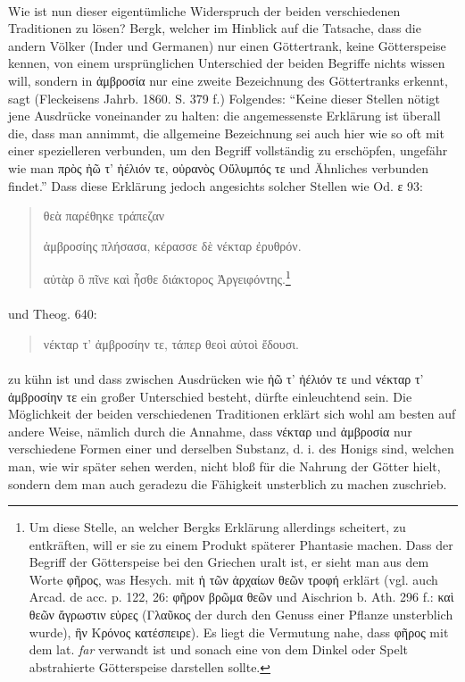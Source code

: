 \documentclass[a4paper, 11pt, oneside]{article}
\begin{document}
\paragraph{}
Wie ist nun dieser eigentümliche Widerspruch der beiden verschiedenen Traditionen zu lösen? Bergk, welcher im Hinblick auf die Tatsache, dass die andern Völker (Inder und Germanen) nur einen Göttertrank, keine Götterspeise kennen, von einem ursprünglichen Unterschied der beiden Begriffe nichts wissen will, sondern in ἀμβροσία nur eine zweite Bezeichnung des Göttertranks erkennt, sagt (Fleckeisens Jahrb. 1860. S. 379 f.) Folgendes: "`Keine dieser Stellen nötigt jene Ausdrücke voneinander zu halten: die angemessenste Erklärung ist überall die, dass man annimmt, die allgemeine Bezeichnung sei auch hier wie so oft mit einer spezielleren verbunden, um den Begriff vollständig zu erschöpfen, ungefähr wie man πρὸς ἠῶ τ' ἠέλιόν τε, οὐρανὸς Οὔλυμπός τε und Ähnliches verbunden findet."' Dass diese Erklärung jedoch angesichts solcher Stellen wie Od. ε 93:
\begin{quotation}
\hspace*{15mm}θεὰ παρέθηκε τράπεζαν

ἀμβροσίης πλήσασα, κέρασσε δὲ νέκταρ ἐρυθρόν.

αὐτὰρ ὃ πῖνε καὶ ἦσθε διάκτορος Ἀργειφόντης.\footnote{Um diese Stelle, an welcher Bergks Erklärung allerdings scheitert, zu entkräften, will er sie zu einem Produkt späterer Phantasie machen. Dass der Begriff der Götterspeise bei den Griechen uralt ist, er sieht man aus dem Worte φῆρος, was Hesych. mit ἡ τῶν ἀρχαίων θεῶν τροφή erklärt (vgl. auch Arcad. de acc. p. 122, 26: φῆρον βρῶμα θεῶν und Aischrion b. Ath. 296 f.: καὶ θεῶν ἄγρωστιν εὑρες (Γλαῦκος der durch den Genuss einer Pflanze unsterblich wurde), ἣν Κρόνος κατέσπειρε). Es liegt die Vermutung nahe, dass φῆρος mit dem lat. \emph{far} verwandt ist und sonach eine von dem Dinkel oder Spelt abstrahierte Götterspeise darstellen sollte.}
\end{quotation}
\paragraph{}
und Theog. 640:
\begin{quotation}
νέκταρ τ' ἀμβροσίην τε, τάπερ θεοὶ αὐτοὶ ἔδουσι.
\end{quotation}
\paragraph{}
zu kühn ist und dass zwischen Ausdrücken wie ἠῶ τ' ἠέλιόν τε und νέκταρ τ' ἀμβροσίην τε ein großer Unterschied besteht, dürfte einleuchtend sein. Die Möglichkeit der beiden verschiedenen Traditionen erklärt sich wohl am besten auf andere Weise, nämlich durch die Annahme, dass νέκταρ und ἀμβροσία nur verschiedene Formen einer und derselben Substanz, d. i. des Honigs sind, welchen man, wie wir später sehen werden, nicht bloß für die Nahrung der Götter hielt, sondern dem man auch geradezu die Fähigkeit unsterblich zu machen zuschrieb.
\end{document}
